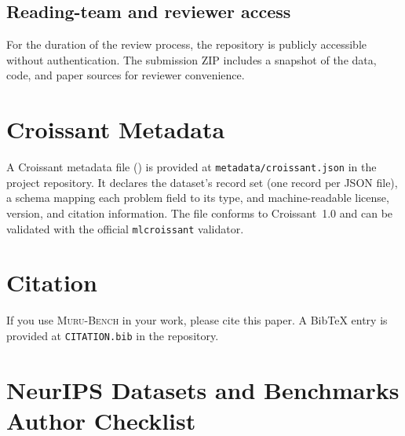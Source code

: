 \documentclass{article}
\newcommand{\muru}{\textsc{Muru-Bench}}
\begin{document}
\subsection*{Reading-team and reviewer access}

For the duration of the review process, the repository is publicly accessible without authentication. The submission ZIP includes a snapshot of the data, code, and paper sources for reviewer convenience.


\section{Croissant Metadata}
\label{app:croissant}

A Croissant metadata file (\citealp{croissant2024}) is provided at \texttt{metadata/croissant.json} in the project repository. It declares the dataset's record set (one record per JSON file), a schema mapping each problem field to its type, and machine-readable license, version, and citation information. The file conforms to Croissant~1.0 and can be validated with the official \texttt{mlcroissant} validator.


\section{Citation}
\label{app:citation}

If you use \muru{} in your work, please cite this paper. A BibTeX entry is provided at \texttt{CITATION.bib} in the repository.


\section{NeurIPS Datasets and Benchmarks Author Checklist}
\label{app:checklist}
\end{document}
